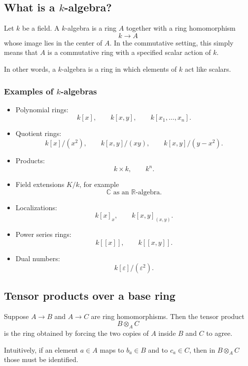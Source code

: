\documentclass[12pt,a4paper]{article}
\theoremstyle{notespace}
\begin{document}
\subsection{What is a \(k\)-algebra?}

Let \(k\) be a field. A \(k\)-algebra is a ring \(A\) together with a ring homomorphism
\[
k\longrightarrow A
\]
whose image lies in the center of \(A\). In the commutative setting, this simply means that \(A\) is a commutative ring with a specified scalar action of \(k\).

In other words, a \(k\)-algebra is a ring in which elements of \(k\) act like scalars.

\subsubsection*{Examples of \(k\)-algebras}

\begin{itemize}
	\item Polynomial rings:
	\[
	k[x],\qquad k[x,y],\qquad k[x_1,\dots,x_n].
	\]
	
	\item Quotient rings:
	\[
	k[x]/(x^2),\qquad k[x,y]/(xy),\qquad k[x,y]/(y-x^2).
	\]
	
	\item Products:
	\[
	k\times k,\qquad k^n.
	\]
	
	\item Field extensions \(K/k\), for example
	\[
	\mathbb C \text{ as an } \mathbb R\text{-algebra}.
	\]
	
	\item Localizations:
	\[
	k[x]_x,\qquad k[x,y]_{(x,y)}.
	\]
	
	\item Power series rings:
	\[
	k[[x]],\qquad k[[x,y]].
	\]
	
	\item Dual numbers:
	\[
	k[\varepsilon]/(\varepsilon^2).
	\]
\end{itemize}

\subsection{Tensor products over a base ring}

Suppose \(A\to B\) and \(A\to C\) are ring homomorphisms. Then the tensor product
\[
B\otimes_A C
\]
is the ring obtained by forcing the two copies of \(A\) inside \(B\) and \(C\) to agree.

Intuitively, if an element \(a\in A\) maps to \(b_a\in B\) and to \(c_a\in C\), then in \(B\otimes_A C\) those must be identified.
\end{document}
